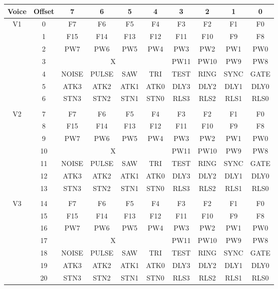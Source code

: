 \begin{table}[h]
	\begin{center}
		\begin{tabular}{|c|c|c|c|c|c|c|c|c|c|} \hline
			Voice & Offset & 7 & 6 & 5 & 4 & 3 & 2 & 1 & 0 \\ \hline\hline
            \multirow{7}{*}{V1} & 0 & F7 & F6 & F5 & F4 & F3 & F2 & F1 & F0 \\ \cline{2-10}
            & 1 & F15 & F14 & F13 & F12 & F11 & F10 & F9 & F8 \\ \cline{2-10}
            & 2 & PW7 & PW6 & PW5 & PW4 & PW3 & PW2 & PW1 & PW0 \\ \cline{2-10}
            & 3 & \multicolumn{4}{|c|}{X} & PW11 & PW10 & PW9 & PW8 \\ \cline{2-10}
            & 4 & NOISE & PULSE & SAW & TRI & TEST & RING & SYNC & GATE \\ \cline{2-10}
            & 5 & ATK3 & ATK2 & ATK1 & ATK0 & DLY3 & DLY2 & DLY1 & DLY0 \\ \cline{2-10}
            & 6 & STN3 & STN2 & STN1 & STN0 & RLS3 & RLS2 & RLS1 & RLS0 \\ \hline

            \multicolumn{10}{c}{} \\ \hline

            \multirow{7}{*}{V2} & 7 & F7 & F6 & F5 & F4 & F3 & F2 & F1 & F0\\ \cline{2-10}
            & 8 & F15 & F14 & F13 & F12 & F11 & F10 & F9 & F8 \\ \cline{2-10}
            & 9 & PW7 & PW6 & PW5 & PW4 & PW3 & PW2 & PW1 & PW0 \\ \cline{2-10}
            & 10 & \multicolumn{4}{|c|}{X} & PW11 & PW10 & PW9 & PW8 \\ \cline{2-10}
            & 11 & NOISE & PULSE & SAW & TRI & TEST & RING & SYNC & GATE \\ \cline{2-10}
            & 12 & ATK3 & ATK2 & ATK1 & ATK0 & DLY3 & DLY2 & DLY1 & DLY0 \\ \cline{2-10}
            & 13 & STN3 & STN2 & STN1 & STN0 & RLS3 & RLS2 & RLS1 & RLS0 \\ \hline

            \multicolumn{10}{c}{} \\ \hline

            \multirow{7}{*}{V3} & 14 & F7 & F6 & F5 & F4 & F3 & F2 & F1 & F0 \\ \cline{2-10}
            & 15 & F15 & F14 & F13 & F12 & F11 & F10 & F9 & F8 \\ \cline{2-10}
            & 16 & PW7 & PW6 & PW5 & PW4 & PW3 & PW2 & PW1 & PW0 \\ \cline{2-10}
            & 17 & \multicolumn{4}{|c|}{X} & PW11 & PW10 & PW9 & PW8 \\ \cline{2-10}
            & 18 & NOISE & PULSE & SAW & TRI & TEST & RING & SYNC & GATE \\ \cline{2-10}
            & 19 & ATK3 & ATK2 & ATK1 & ATK0 & DLY3 & DLY2 & DLY1 & DLY0 \\ \cline{2-10}
            & 20 & STN3 & STN2 & STN1 & STN0 & RLS3 & RLS2 & RLS1 & RLS0 \\ \hline


\end{tabular}
\end{center}
\end{table}
